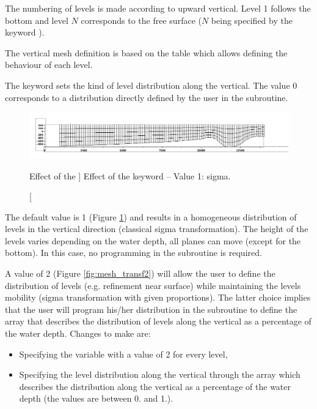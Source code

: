 The numbering of levels is made according to upward vertical. Level 1 follows
the bottom and level $N$ corresponds to the free surface ($N$
being specified by the keyword ).

The vertical mesh definition is based on the  table which
allows defining the behaviour of each level.

The keyword  sets the kind of level distribution
along the vertical. The value 0 corresponds to a distribution directly defined
by the user in the  subroutine.

\begin{figure}[H]%
\begin{center}
%
  \includegraphics[width=\textwidth]{./graphics/mesh_transformation}
%
\end{center}
\caption
[Effect of the ]
{Effect of the  keyword -- Value 1: sigma.}
\label{fig:mesh_transf}
\end{figure}

The default value is 1 (Figure \ref{fig:mesh_transf}) and results in a
homogeneous distribution of levels in the vertical direction (classical sigma
transformation). The height of the levels varies depending on the water depth,
all planes can move (except for the bottom). In this case, no programming in
the  subroutine is required.

A value of 2 (Figure \ref{fig:mesh_transf2}) will allow the user to define the
distribution of levels (e.g. refinement near surface) while maintaining the
levels mobility (sigma transformation with given proportions). The latter
choice implies that the user will program his/her distribution in the
 subroutine to define the array  that describes
the distribution of levels along the vertical as a percentage of the water depth.
Changes to make are:

\begin{itemize}
\item Specifying the variable  with a value of 2
for every level,

\item Specifying the level distribution along the vertical through the array
 which describes the distribution along the vertical as a
percentage of the water depth (the values are between 0. and 1.).
\end{itemize}

